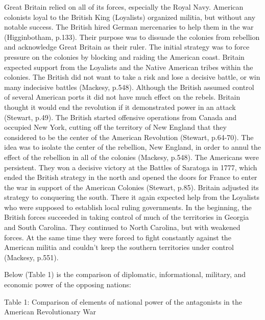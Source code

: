 Great Britain relied on all of its forces, especially the Royal Navy.  American
colonists loyal to the British King (Loyalists) organized militia, but without
any notable success.  The British hired German mercenaries to help them in the
war (Higginbotham, p.133).  Their purpose was to dissuade the colonies from
rebellion and acknowledge Great Britain as their ruler.  The initial strategy
was to force pressure on the colonies by blocking and raiding the American
coast. Britain expected support from the Loyalists and the Native American
tribes within the colonies. The British did not want to take a risk and lose a
decisive battle, or win many indecisive battles (Mackesy, p.548).  Although the
British assumed control of several American ports it did not have much effect on
the rebels.  Britain thought it would end the revolution if it demonstrated
power in an attack (Stewart, p.49).  The British started offensive operations
from Canada and occupied New York, cutting off the territory of New England that
they considered to be the center of the American Revolution (Stewart, p.64-70).
The idea was to isolate the center of the rebellion, New England, in order to
annul the effect of the rebellion in all of the colonies (Mackesy, p.548).  The
Americans were persistent.  They won a decisive victory at the Battles of
Saratoga in 1777, which ended the British strategy in the north and opened the
doors for France to enter the war in support of the American Colonies (Stewart,
p.85).  Britain adjusted its strategy to conquering the south.  There it again
expected help from the Loyalists who were supposed to establish local ruling
governments.  In the beginning, the British forces succeeded in taking control
of much of the territories in Georgia and South Carolina.  They continued to
North Carolina, but with weakened forces.  At the same time they were forced to
fight constantly against the American militia and couldn’t keep the southern
territories under control (Mackesy, p.551).

    Below (Table 1) is the comparison of diplomatic, informational, military,
    and economic power of the opposing nations:

    Table 1: Comparison of elements of national power of the antagonists in the
    American Revolutionary War




